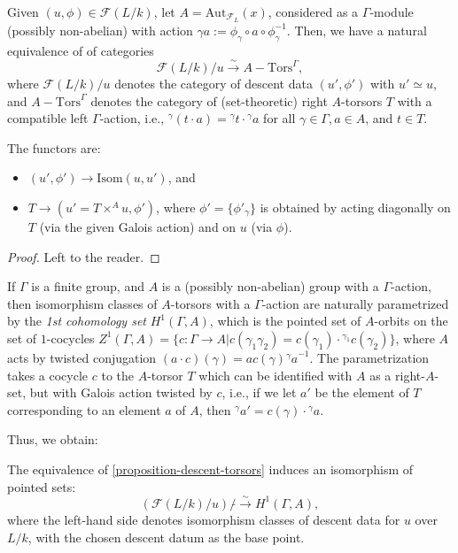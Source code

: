 \begin{proposition}
 \label{proposition-descent-torsors}
Given $(u, \phi) \in \mathcal F(L/k)$, let $A=\text{Aut}_{\mathcal F_L}(x)$, considered as a $\Gamma$-module (possibly non-abelian) with action ${\gamma a}:= \phi_\gamma\circ a \circ \phi_\gamma^{-1}$. Then, we have a natural equivalence of of categories
$$ \mathcal F(L/k)/u \xrightarrow\sim A-\text{Tors}^\Gamma,$$
where $\mathcal F(L/k)/u $ denotes the category of descent data $(u', \phi')$ with $u'\simeq u$, and $A-\text{Tors}^\Gamma$ denotes the category of (set-theoretic) right $A$-torsors $T$ with a compatible left $\Gamma$-action, i.e., ${^\gamma(t\cdot a)} = {^\gamma t} \cdot {^\gamma a}$ for all $\gamma\in\Gamma, a\in A$, and $t\in T$.

The functors are: 
\begin{itemize}
 \item $(u',\phi')\to \text{Isom}(u, u')$, and
 \item $T \to (u'= T\times^A u, \phi')$, where $\phi' = \{\phi'_\gamma\}$ is obtained by acting diagonally on $T$ (via the given Galois action) and on $u$ (via $\phi$).  
\end{itemize}

\end{proposition}

\begin{proof}
Left to the reader. 
\end{proof}



If $\Gamma$ is a finite group, and $A$ is a (possibly non-abelian) group with a $\Gamma$-action, then isomorphism classes of $A$-torsors with a $\Gamma$-action are naturally parametrized by the \emph{1st cohomology set} $H^1(\Gamma, A)$, which is the pointed set of $A$-orbits on the set of $1$-cocycles $Z^1(\Gamma, A) = \{c:\Gamma\to A| c(\gamma_1 \gamma_2) = c(\gamma_1) \cdot {^{\gamma_1}c(\gamma_2)}\}$, where $A$ acts by twisted conjugation $(a\cdot c)(\gamma) = a c(\gamma) {^\gamma a}^{-1}$. The parametrization takes a cocycle $c$ to the $A$-torsor $T$ which can be identified with $A$ as a right-$A$-set, but with Galois action twisted by $c$, i.e., if we let $a'$ be the element of $T$ corresponding to an element $a$ of $A$, then ${^\gamma a'} = c(\gamma) \cdot {^\gamma a} $. 


Thus, we obtain:

\begin{proposition}
 \label{proposition-descent-cohomology}
The equivalence of \ref{proposition-descent-torsors} induces an isomorphism of pointed sets:
$$ (\mathcal F(L/k)/u)/\tilde{ }\xrightarrow\sim H^1(\Gamma, A),$$
where the left-hand side denotes isomorphism classes of descent data for $u$ over $L/k$, with the chosen descent datum as the base point.
\end{proposition}

